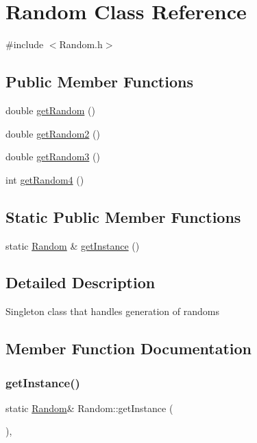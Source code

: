 \hypertarget{classRandom}{}\section{Random Class Reference}
\label{classRandom}


{\ttfamily \#include $<$Random.\+h$>$}

\subsection*{Public Member Functions}
\begin{DoxyCompactItemize}
\item 
double \hyperlink{classRandom_a41da5ad61d3b9c1cf79865cd899177ce}{get\+Random} ()
\item 
double \hyperlink{classRandom_ad03bbe9b556bbe4dd2b257550dd8dd79}{get\+Random2} ()
\item 
double \hyperlink{classRandom_af66ee8ebad35ab5af5f89d3df466f363}{get\+Random3} ()
\item 
int \hyperlink{classRandom_a4046851c0a4a16d47bde664b47007927}{get\+Random4} ()
\end{DoxyCompactItemize}
\subsection*{Static Public Member Functions}
\begin{DoxyCompactItemize}
\item 
static \hyperlink{classRandom}{Random} \& \hyperlink{classRandom_ab578db3a2ca135e1e4834bf0bdfe1ae2}{get\+Instance} ()
\end{DoxyCompactItemize}


\subsection{Detailed Description}
Singleton class that handles generation of randoms 

\subsection{Member Function Documentation}
\mbox{\label{classRandom_ab578db3a2ca135e1e4834bf0bdfe1ae2}} 
\subsubsection{\texorpdfstring{get\+Instance()}{getInstance()}}
{\footnotesize\ttfamily static \hyperlink{classRandom}{Random}\& Random\+::get\+Instance (\begin{DoxyParamCaption}{ }\end{DoxyParamCaption})\hspace{0.3cm}{\ttfamily [inline]}, {\ttfamily [static]}}


